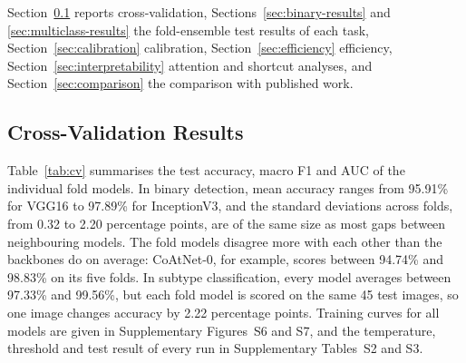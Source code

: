 \documentclass[final,3p,times,number]{elsarticle}
\begin{document}
Section~\ref{sec:cv-results} reports cross-validation, Sections~\ref{sec:binary-results} and \ref{sec:multiclass-results} the fold-ensemble test results of each task, Section~\ref{sec:calibration} calibration, Section~\ref{sec:efficiency} efficiency, Section~\ref{sec:interpretability} attention and shortcut analyses, and Section~\ref{sec:comparison} the comparison with published work.

\subsection{Cross-Validation Results}
\label{sec:cv-results}

Table~\ref{tab:cv} summarises the test accuracy, macro F1 and AUC of the individual fold models. In binary detection, mean accuracy ranges from 95.91\% for VGG16 to 97.89\% for InceptionV3, and the standard deviations across folds, from 0.32 to 2.20 percentage points, are of the same size as most gaps between neighbouring models. The fold models disagree more with each other than the backbones do on average: CoAtNet-0, for example, scores between 94.74\% and 98.83\% on its five folds. In subtype classification, every model averages between 97.33\% and 99.56\%, but each fold model is scored on the same 45 test images, so one image changes accuracy by 2.22 percentage points. Training curves for all models are given in Supplementary Figures~S6 and S7, and the temperature, threshold and test result of every run in Supplementary Tables~S2 and S3.
\end{document}
